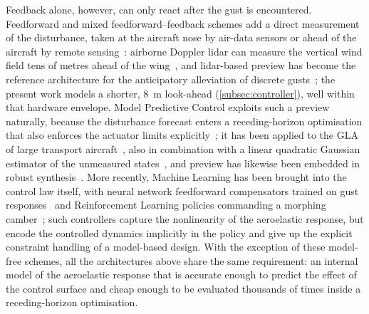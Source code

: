 Feedback alone, however, can only react after the gust is encountered. Feedforward and mixed feedforward--feedback schemes add a direct measurement of the disturbance, taken at the aircraft nose by air-data sensors or ahead of the aircraft by remote sensing~\cite{alam2015mixed}: airborne Doppler lidar can measure the vertical wind field tens of metres ahead of the wing~\cite{rabadan2010lidar}, and lidar-based preview has become the reference architecture for the anticipatory alleviation of discrete gusts~\cite{fezans2017lidar,cavaliere2022estimator,fournier2022lidar}; the present work models a shorter, \SI{8}{\meter} look-ahead (\cref{subsec:controller}), well within that hardware envelope. Model Predictive Control exploits such a preview naturally, because the disturbance forecast enters a receding-horizon optimisation that also enforces the actuator limits explicitly~\cite{rawlings2017mpc}; it has been applied to the GLA of large transport aircraft~\cite{giesseler2012mpc}, also in combination with a linear quadratic Gaussian estimator of the unmeasured states~\cite{liu2017lqgmpc}, and preview has likewise been embedded in robust synthesis~\cite{ting2023preview}. More recently, Machine Learning has been brought into the control law itself, with neural network feedforward compensators trained on gust responses~\cite{zhou2024feedforward} and Reinforcement Learning policies commanding a morphing camber~\cite{hu2025rl}; such controllers capture the nonlinearity of the aeroelastic response, but encode the controlled dynamics implicitly in the policy and give up the explicit constraint handling of a model-based design. With the exception of these model-free schemes, all the architectures above share the same requirement: an internal model of the aeroelastic response that is accurate enough to predict the effect of the control surface and cheap enough to be evaluated thousands of times inside a receding-horizon optimisation.

